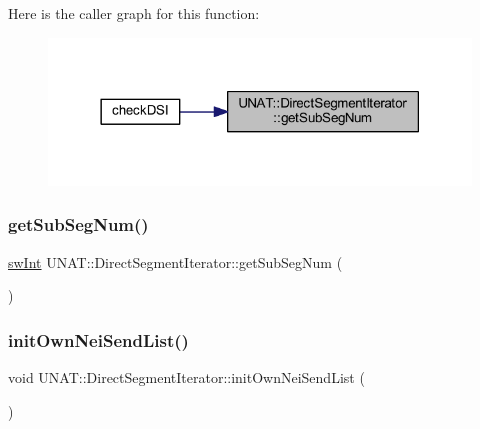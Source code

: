 Here is the caller graph for this function\+:
\nopagebreak
\begin{figure}[H]
\begin{center}
\leavevmode
\includegraphics[width=318pt]{classUNAT_1_1DirectSegmentIterator_a8aced068087f2492ad30376d6cec1294_icgraph}
\end{center}
\end{figure}
\mbox{\label{classUNAT_1_1DirectSegmentIterator_a8aced068087f2492ad30376d6cec1294}} 
\subsubsection{\texorpdfstring{getSubSegNum()}{getSubSegNum()}\hspace{0.1cm}{\footnotesize\ttfamily [2/2]}}
{\footnotesize\ttfamily \mbox{\hyperlink{include_2swMacro_8h_a113cf5f6b5377cdf3fac6aa4e443e9aa}{sw\+Int}} U\+N\+A\+T\+::\+Direct\+Segment\+Iterator\+::get\+Sub\+Seg\+Num (\begin{DoxyParamCaption}{ }\end{DoxyParamCaption})\hspace{0.3cm}{\ttfamily [inline]}}

\mbox{\label{classUNAT_1_1DirectSegmentIterator_a425e2615f975bf06a5915105eee718f6}} 
\subsubsection{\texorpdfstring{initOwnNeiSendList()}{initOwnNeiSendList()}\hspace{0.1cm}{\footnotesize\ttfamily [1/2]}}
{\footnotesize\ttfamily void U\+N\+A\+T\+::\+Direct\+Segment\+Iterator\+::init\+Own\+Nei\+Send\+List (\begin{DoxyParamCaption}{ }\end{DoxyParamCaption})\hspace{0.3cm}{\ttfamily [private]}}


